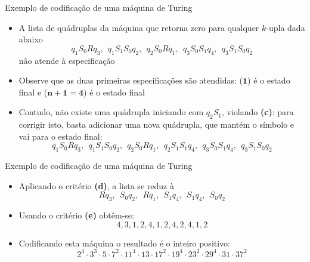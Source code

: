 \begin{frame}[fragile]{Exemplo de codificação de uma máquina de Turing}

    \begin{itemize}
        \item A lista de quádruplas da máquina que retorna zero para qualquer $k$-upla dada abaixo
        \[
            q_1S_0Rq_3, \ \ q_1S_1S_0q_2, \ \ q_2S_0Rq_1, \ \ q_3S_0S_1q_4, \ \ q_3S_1S_0q_2
        \]
        não atende à especificação

        \item Observe que as duas primeiras especificações são atendidas: ($\mathbf{1}$) é o 
            estado final e ($\mathbf{n + 1} = \mathbf{4}$) é o estado final

        \item Contudo, não existe uma quádrupla iniciando com $q_2S_1$, violando \textbf{(c)}:
            para corrigir isto, basta adicionar uma nova quádrupla, que mantém o símbolo e 
            vai para o estado final:
        \[
            q_1S_0Rq_3, \ \ q_1S_1S_0q_2, \ \ q_2S_0Rq_1,\ \ q_2S_1S_1q_4,\ \ q_3S_0S_1q_4, \ \ q_3S_1S_0q_2
        \]
        
    \end{itemize}

\end{frame}

\begin{frame}[fragile]{Exemplo de codificação de uma máquina de Turing}

    \begin{itemize}
        \item Aplicando o critério \textbf{(d)}, a lista se reduz à
        \[
            Rq_3, \ \ S_0q_2, \ \ Rq_1,\ \ S_1q_4,\ \ S_1q_4, \ \ S_0q_2
        \]

        \item Usando o critério \textbf{(e)} obtêm-se:
        \[
            4, 3, 1, 2, 4, 1, 2, 4, 2, 4, 1, 2
        \]

        \item Codificando esta máquina o resultado é o inteiro positivo:
        \[
            2^4\cdot 3^3\cdot 5\cdot 7^2\cdot 11^4\cdot 13\cdot 17^2\cdot 19^4\cdot 23^2\cdot 29^4\cdot 31\cdot 37^2
        \]
    \end{itemize}

\end{frame}


